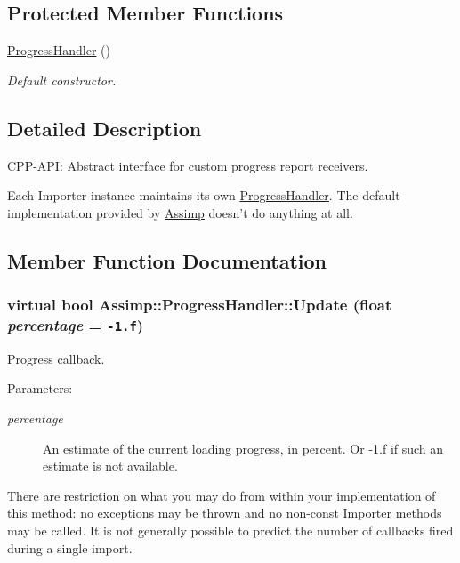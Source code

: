 \subsection*{Protected Member Functions}
\begin{CompactItemize}
\item 
\hypertarget{class_assimp_1_1_progress_handler_53b192913e9904c674b851c46e1ea9e8}{
\hyperlink{class_assimp_1_1_progress_handler_53b192913e9904c674b851c46e1ea9e8}{ProgressHandler} ()}
\label{class_assimp_1_1_progress_handler_53b192913e9904c674b851c46e1ea9e8}

\begin{CompactList}\small\item\em Default constructor. \item\end{CompactList}\end{CompactItemize}


\subsection{Detailed Description}
CPP-API: Abstract interface for custom progress report receivers. 

Each Importer instance maintains its own \hyperlink{class_assimp_1_1_progress_handler_53b192913e9904c674b851c46e1ea9e8}{ProgressHandler}. The default implementation provided by \hyperlink{namespace_assimp}{Assimp} doesn't do anything at all. 

\subsection{Member Function Documentation}
\hypertarget{class_assimp_1_1_progress_handler_b08a1d300d434f6dd86ca41747cba448}{
\subsubsection[Update]{\setlength{\rightskip}{0pt plus 5cm}virtual bool Assimp::ProgressHandler::Update (float {\em percentage} = {\tt -1.f})}}
\label{class_assimp_1_1_progress_handler_b08a1d300d434f6dd86ca41747cba448}


Progress callback. 

\begin{Desc}
\item[Parameters:]
\begin{description}
\item[{\em percentage}]An estimate of the current loading progress, in percent. Or -1.f if such an estimate is not available.\end{description}
\end{Desc}
There are restriction on what you may do from within your implementation of this method: no exceptions may be thrown and no non-const Importer methods may be called. It is not generally possible to predict the number of callbacks fired during a single import.

